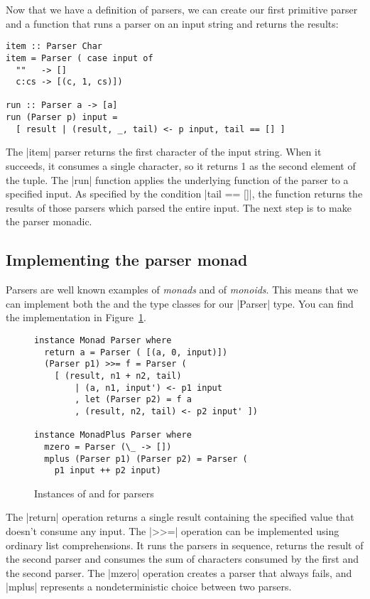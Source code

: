 \documentclass{tmr}
\begin{document}
Now that we have a definition of parsers, we can create our first primitive parser and a 
function that runs a parser on an input string and returns the results:

\begin{verbatim}
item :: Parser Char
item = Parser ( case input of
  ""   -> []
  c:cs -> [(c, 1, cs)])
  
run :: Parser a -> [a]
run (Parser p) input = 
  [ result | (result, _, tail) <- p input, tail == [] ]
\end{verbatim}
The |item| parser returns the first character of the input string. When it succeeds, it consumes 
a single character, so it returns 1 as the second element of the tuple. The |run| function
applies the underlying function of the parser to a specified input. As specified by the condition
|tail == []|, the function returns the results of those parsers which parsed the entire input.
The next step is to make the parser monadic.


\subsection{Implementing the parser monad}
Parsers are well known examples of \textit{monads} and of \textit{monoids}. This means that we can 
implement both the  and the  type
classes for our |Parser| type. You
can find the implementation in Figure~\ref{fig:monad-instance}.

\begin{figure}
\begin{verbatim}
instance Monad Parser where
  return a = Parser ( [(a, 0, input)])
  (Parser p1) >>= f = Parser (
    [ (result, n1 + n2, tail) 
        | (a, n1, input') <- p1 input
        , let (Parser p2) = f a
        , (result, n2, tail) <- p2 input' ])

instance MonadPlus Parser where 
  mzero = Parser (\_ -> [])
  mplus (Parser p1) (Parser p2) = Parser (
    p1 input ++ p2 input)
\end{verbatim}
\caption{Instances of  and  for parsers}
\label{fig:monad-instance}
\end{figure}

The |return| operation returns a single result containing the specified value that doesn't consume
any input. The |>>=| operation can be implemented using ordinary list comprehensions.
It runs the parsers in sequence, returns the result of the second parser and consumes the sum of 
characters consumed by the first and the second parser. The |mzero| operation creates a parser that 
always fails, and |mplus| represents a nondeterministic
choice between two parsers. 
\end{document}
